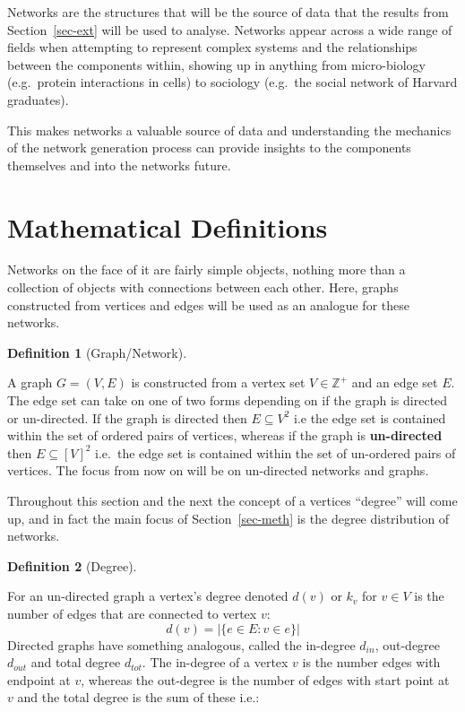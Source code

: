 \documentclass[
  10pt,
  a4paper,
]{scrreprt}
\theoremstyle{plain}
\theoremstyle{definition}
\newtheorem{definition}{Definition}[section]
\theoremstyle{remark}
\begin{document}
{Networks are the structures that will be the source of data that the
results from Section~\ref{sec-ext} will be used to analyse. Networks
appear across a wide range of fields when attempting to represent
complex systems and the relationships between the components within,
showing up in anything from micro-biology (e.g.~protein interactions in
cells) to sociology (e.g.~the social network of Harvard graduates).

This makes networks a valuable source of data and understanding the
mechanics of the network generation process can provide insights to the
components themselves and into the networks future.

\hypertarget{mathematical-definitions}{%
\section{Mathematical Definitions}\label{mathematical-definitions}}

Networks on the face of it are fairly simple objects, nothing more than
a collection of objects with connections between each other. Here,
graphs constructed from vertices and edges will be used as an analogue
for these networks.

\begin{definition}[Graph/Network]\protect\hypertarget{def-net}{}\label{def-net}

A graph \(G = (V,E)\) is constructed from a vertex set
\(V\in\mathbb Z^+\) and an edge set \(E\). The edge set can take on one
of two forms depending on if the graph is directed or un-directed. If
the graph is directed then \(E\subseteq V^2\) i.e the edge set is
contained within the set of ordered pairs of vertices, whereas if the
graph is \textbf{un-directed} then \(E\subseteq [V]^2\) i.e.~the edge
set is contained within the set of un-ordered pairs of vertices. The
focus from now on will be on un-directed networks and graphs.

\end{definition}

Throughout this section and the next the concept of a vertices
``degree'' will come up, and in fact the main focus of
Section~\ref{sec-meth} is the degree distribution of networks.

\begin{definition}[Degree]\protect\hypertarget{def-deg}{}\label{def-deg}

For an un-directed graph a vertex's degree denoted \(d(v)\) or \(k_v\)
for \(v\in V\) is the number of edges that are connected to vertex
\(v\): \[
d(v) = |\{e\in E : v \in e\}|
\] Directed graphs have something analogous, called the in-degree
\(d_{in}\), out-degree \(d_{out}\) and total degree \(d_{tot}\). The
in-degree of a vertex \(v\) is the number edges with endpoint at \(v\),
whereas the out-degree is the number of edges with start point at \(v\)
and the total degree is the sum of these i.e.:


\end{definition}}
\end{document}
